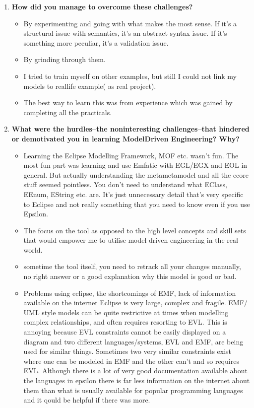 \documentclass[12pt, a4paper]{report}
\begin{document}
\begin{appendices}
\begin{enumerate}
\item \textbf{How did you manage to overcome these challenges?}
\begin{itemize}
\item By experimenting and going with what makes the most sense. If it's a structural issue with semantics, it's an abstract syntax issue. If it's something more peculiar, it's a validation issue.
\item By grinding through them.
\item I tried to train myself on other examples, but still I could not link my models to real­life example( as real project). 
\item The best way to learn this was from experience which was gained by completing all the practicals.
\end{itemize}


\item \textbf{ What were the hurdles--the non­interesting challenges--that hindered or demotivated you in learning Model­Driven Engineering? Why?}
\begin{itemize}
\item Learning the Eclipse Modelling Framework, MOF etc. wasn't fun. The most fun part was learning and use Emfatic with EGL/EGX and EOL in general. But actually understanding the meta­metamodel and all the ecore stuff seemed pointless. You don't need to understand what EClass, EEnum, EString etc. are. It's just unnecessary detail that's very specific to
Eclipse and not really something that you need to know even if you use Epsilon.
\item The focus on the tool as opposed to the high level concepts and skill sets that would empower me to utilise model driven engineering in the real world.
\item sometime the tool itself, you need to re­track all your changes manually, no right answer or a good explanation why this model is good or bad.
\item Problems using eclipse, the shortcomings of EMF, lack of information available on the internet Eclipse is very large, complex and fragile. EMF/ UML ­style models can be quite restrictive at times when modelling complex relationships, and often requires resorting to EVL. This is annoying because EVL constraints cannot be easily displayed on a diagram and two different languages/systems, EVL and EMF, are being used for similar things. Sometimes two very similar constraints exist where one can be modeled in EMF and the
other can't and so requires EVL. Although there is a lot of very good documentation available about the languages in epsilon there is far less information on the internet about them than what is usually available for popular programming languages and it qould be helpful if there was more.
\end{itemize}


\end{enumerate}
\end{appendices}
\end{document}
